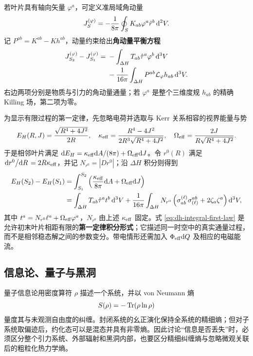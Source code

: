 若叶片具有轴向矢量 $\varphi^a$，可定义准局域角动量
\begin{equation}
    J_S^{(\varphi)}
      =-\frac{1}{8\pi}\oint_S K_{ab}\varphi^a\hat r^b\,\dd^2V .
\end{equation}
记 $P^{ab}=K^{ab}-Kh^{ab}$，动量约束给出\textbf{角动量平衡方程}
\begin{equation}
\begin{split}
    J_{S_2}^{(\varphi)}-J_{S_1}^{(\varphi)}
      ={}&-\int_{\Delta H}T_{ab}\hat\tau^a\varphi^b\,\dd^3V\\
       &-\frac{1}{16\pi}\int_{\Delta H}
          P^{ab}\mathcal L_\varphi h_{ab}\,\dd^3V .
\end{split}
\end{equation}
右边两项分别是物质与引力的角动量通量；若 $\varphi^a$ 是整个三维度规 $h_{ab}$ 的精确 Killing 场，第二项为零。

为显示有限过程的第一定律，先忽略电荷并选取与 Kerr 关系相容的视界能量与势
\[
    E_H(R,J)=\frac{\sqrt{R^4+4J^2}}{2R},\quad
    \kappa_{\rm eff}=\frac{R^4-4J^2}
      {2R^3\sqrt{R^4+4J^2}},\quad
    \Omega_{\rm eff}=\frac{2J}{R\sqrt{R^4+4J^2}}.
\]
于是相邻叶片满足 $\dd E_H=\kappa_{\rm eff}\dd A/(8\pi)+\Omega_{\rm eff}\dd J$。令 $r^0(R)$ 满足 $\dv*{r^0}{R}=2R\kappa_{\rm eff}$，并记 $N_{r^0}=|D r^0|$；沿 $\Delta H$ 积分则得到
\begin{equation}\label{eq:dh-integral-first-law}
\begin{split}
    E_H(S_2)-E_H(S_1)
      &=
      \int_{S_1}^{S_2}
      \left(\frac{\kappa_{\rm eff}}{8\pi}\dd A
      +\Omega_{\rm eff}\dd J\right)\\
      &=\int_{\Delta H}T_{ab}\hat\tau^at^b\,\dd^3V
      +\frac{1}{16\pi}\int_{\Delta H}N_{r^0}
        \left(\sigma^{(\ell)}_{ab}\sigma_{(\ell)}^{ab}
        +2\zeta_a\zeta^a\right)\dd^3V ,
\end{split}
\end{equation}
其中 $t^a=N_{r^0}\ell^a+\Omega_{\rm eff}\varphi^a$，$N_{r^0}$ 由上述 $\kappa_{\rm eff}$ 固定。式 \eqref{eq:dh-integral-first-law} 是允许初末叶片相距有限的\textbf{第一定律积分形式}；它描述同一时空中的真实通量过程，而不是相邻稳态解之间的参数变分。带电情形还需加入 $\Phi_{\rm eff}\dd Q$ 及相应的电磁能流。

\subsection{信息论、量子与黑洞}

量子信息论用密度算符 $\rho$ 描述一个系统，并以 von Neumann 熵
\[
    S(\rho)=-\Tr(\rho\ln\rho)
\]
量度其与未观测自由度的纠缠。封闭系统的幺正演化保持全系统的精细熵；但对子系统取偏迹后，约化态可以是混态并具有非零熵。因此讨论“信息是否丢失”时，必须区分整个引力系统、外部辐射和黑洞内部，也要区分精细纠缠熵与忽略微观关联后的粗粒化热力学熵。

